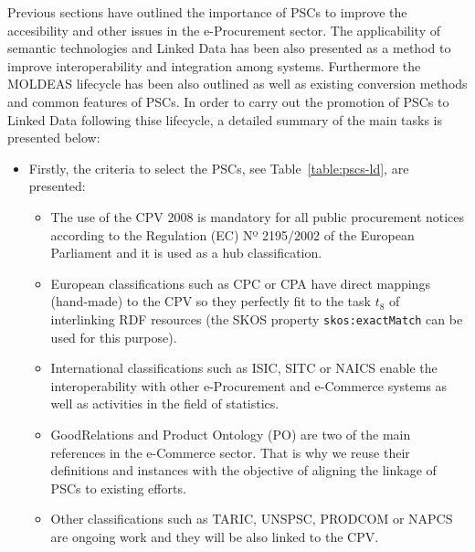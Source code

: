 Previous sections have outlined the importance of PSCs to improve the accesibility and other issues in 
the e-Procurement sector. The applicability of semantic technologies and Linked Data has been also presented 
as a method to improve interoperability and integration among systems. Furthermore the MOLDEAS lifecycle has been 
also outlined as well as existing conversion methods and common features of PSCs. In order to carry out 
the promotion of PSCs to Linked Data following thise lifecycle, a detailed summary of the main tasks is presented below:

\begin{itemize}
 \item  Firstly, the criteria to select the PSCs, see Table~\ref{table:pscs-ld}, are presented:
\begin{itemize}
 \item The use of the CPV 2008 is mandatory for all public procurement notices according 
 to the Regulation (EC) Nº 2195/2002 of the European Parliament and it is used as a hub classification.
 \item European classifications such as CPC or CPA have direct mappings (hand-made) to the CPV so they perfectly fit 
 to the task $t_8$ of interlinking RDF resources (the SKOS property \texttt{skos:exactMatch} can be used for this purpose).
 \item International classifications such as ISIC, SITC or NAICS enable the interoperability with 
 other e-Procurement and e-Commerce systems as well as activities in the field of statistics.
 \item GoodRelations and Product Ontology (PO) are two of the main references in the e-Commerce sector. 
 That is why we reuse their definitions and instances with the objective of aligning the linkage of PSCs to existing efforts. 
 \item Other classifications such as TARIC, UNSPSC, PRODCOM or NAPCS are ongoing work and they will be also linked to the CPV.
\end{itemize}


\end{itemize}
